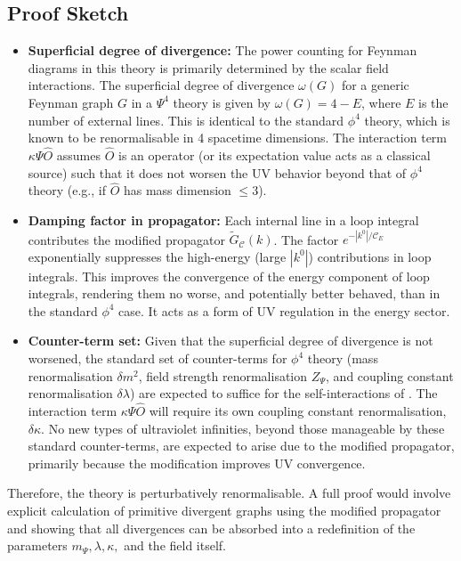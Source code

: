 \documentclass[11pt,a4paper]{article}
\newcommand{\PsiField}{\ensuremath{\Psi}}
\newcommand{\PropSpeed}{\ensuremath{\mathscr{C}}}
\begin{document}
\subsection*{Proof Sketch}
\begin{itemize}
    \item \textbf{Superficial degree of divergence:} The power counting for Feynman diagrams in this theory is primarily determined by the scalar field interactions. The superficial degree of divergence $\omega(G)$ for a generic Feynman graph $G$ in a $\PsiField^4$ theory is given by $\omega(G) = 4 - E$, where $E$ is the number of external \PsiFieldField lines. This is identical to the standard $\phi^4$ theory, which is known to be renormalisable in 4 spacetime dimensions. The interaction term $\kappa\PsiField\hat{O}$ assumes $\hat{O}$ is an operator (or its expectation value acts as a classical source) such that it does not worsen the UV behavior beyond that of $\phi^4$ theory (e.g., if $\hat{O}$ has mass dimension $\leq 3$).

    \item \textbf{Damping factor in propagator:} Each internal \PsiFieldField line in a loop integral contributes the modified propagator $\tilde G_{\PropSpeed}(k)$. The factor $e^{-|k^{0}|/\PropSpeed_{E}}$ exponentially suppresses the high-energy (large $|k^0|$) contributions in loop integrals. This improves the convergence of the energy component of loop integrals, rendering them no worse, and potentially better behaved, than in the standard $\phi^4$ case. It acts as a form of UV regulation in the energy sector.

    \item \textbf{Counter-term set:} Given that the superficial degree of divergence is not worsened, the standard set of counter-terms for $\phi^4$ theory (mass renormalisation $\delta m^2$, field strength renormalisation $Z_\PsiField$, and coupling constant renormalisation $\delta\lambda$) are expected to suffice for the self-interactions of \PsiFieldField. The interaction term $\kappa\PsiField\hat{O}$ will require its own coupling constant renormalisation, $\delta\kappa$. No new types of ultraviolet infinities, beyond those manageable by these standard counter-terms, are expected to arise due to the modified propagator, primarily because the modification improves UV convergence.
\end{itemize}
Therefore, the theory is perturbatively renormalisable. A full proof would involve explicit calculation of primitive divergent graphs using the modified propagator and showing that all divergences can be absorbed into a redefinition of the parameters $m_\PsiField, \lambda, \kappa,$ and the field \PsiFieldField itself.
\end{document}

